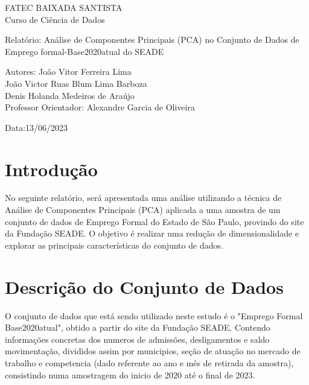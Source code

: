 \documentclass{article}
\begin{document}
\date{} %
\begin{titlepage}
    \begin{center}
        \LARGE FATEC BAIXADA SANTISTA \\ Curso de Ciência de Dados\\
        
        \vspace{8cm}
        
        \LARGE Relatório: Análise de Componentes Principais (PCA) no Conjunto de Dados de Emprego formal-Base2020atual do SEADE\\
        
        \vspace{8cm}
        
        \large Autores: João Vitor Ferreira Lima\\
        João Victor Ruas Blum Lima Barboza\\
        Denis Holanda Medeiros de Araújo \\
Professor Orientador: Alexandre Garcia de Oliveira \\
        
        \vspace{2cm}
        
        \large Data:13/06/2023
    \end{center}
\end{titlepage}
\maketitle


\section{Introdução}

No seguinte relatório, será apresentada uma análise utilizando a técnica de Análise de Componentes Principais (PCA) aplicada a uma amostra de um conjunto de dados de Emprego Formal do Estado de São Paulo, provindo do site da Fundação SEADE. O objetivo é realizar uma redução de dimensionalidade e explorar as principais características do conjunto de dados.

\section{Descrição do Conjunto de Dados}

O conjunto de dados que está sendo utilizado neste estudo é o "Emprego Formal Base2020atual", obtido a partir do site da Fundação SEADE. Contendo informações concretas dos numeros de admissões, desligamentos e saldo movimentação, divididos assim por municipios, seção de atuação no mercado de trabalho e competencia (dado referente ao ano e mês de retirada da amostra), consistindo numa amostragem do inicio de 2020 até o final de 2023.
\end{document}
